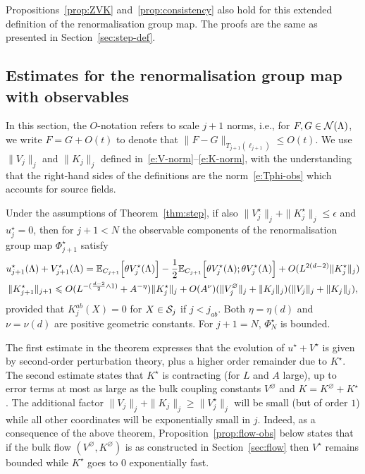 \documentclass[11pt]{amsart}
\numberwithin{equation}{section}
\numberwithin{theorem}{section}
\newcommand{\1}{{\bf 1}}
\newcommand{\obs}{\star}
\newcommand{\Vbulk}{V^\varnothing}
\newcommand{\Vobs}{V^\obs}
\newcommand{\uobs}{u^\obs}
\newcommand{\Kbulk}{K^\varnothing}
\newcommand{\Kobs}{K^\obs}
\newcommand{\dplus}{(\frac{d-2}{2} \wedge 1)}
\begin{document}
Propositions~\ref{prop:ZVK}
and~\ref{prop:consistency} also hold for
this extended definition of the renormalisation group map. The proofs
are the same as presented in Section~\ref{sec:step-def}.


\subsection{Estimates for the renormalisation group map with observables}
\label{sec:tyler-renorm-group}

In this section, the $O$-notation refers to scale $j+1$ norms, i.e.,
for $F,G \in \mathcal N(\Lambda)$, we write $F=G+O(t)$ to denote that
$\|F-G\|_{T_{j+1}(\ell_{j+1})} \leq O(t)$. We use
  $\|V_{j}\|_{j}$ and $\|K_{j}\|_{j}$ defined in~\eqref{e:V-norm}--\eqref{e:K-norm},
  with the understanding that the right-hand sides of the definitions
  are the norm~\eqref{e:Tphi-obs} which accounts for source fields.

\begin{theorem} 
  \label{thm:step-obs} 
  Under the assumptions of Theorem~\ref{thm:step}, if also
  $\|\Vobs_j\|_j+\|\Kobs_j\|_j \leq \epsilon$ and $\uobs_j=0$, then for
  $j+1<N$ the observable components of the renormalisation group map
  $\Phi^\obs_{j+1}$ satisfy
  \begin{gather}
    \label{e:V+obs-bd}
    \uobs_{j+1}(\Lambda) +\Vobs_{j+1}(\Lambda)
    =  \E_{C_{j+1}}\qB{\theta \Vobs_j(\Lambda)} - \frac12 \E_{C_{j+1}}\qB{\theta \Vobs_j(\Lambda);\theta\Vobs_j(\Lambda)}
      + O(L^{2(d-2)}\|\Kobs_j\|_j) 
                      \\
    \label{e:K+obs-bd}
    \|\Kobs_{j+1}\|_{j+1} \leq O(L^{-\dplus}+A^{-\eta})\|\Kobs_j\|_j
    + O(A^{\nu}) (\|\Vbulk_j\|_j +\|K_{j}\|_{j})      (\|V_j\|_j+\|K_j\|_j),
  \end{gather}
  provided that $K^{ab}_j(X)=0$ for $X\in \mathcal S_j$ if
  $j<j_{ab}$. Both $\eta=\eta(d)$ and $\nu=\nu(d)$ are
  positive geometric constants.
  For $j+1=N$, $\Phi^\obs_{N}$ is bounded.
\end{theorem}

The first estimate in the theorem expresses that the evolution
of $\uobs+\Vobs$ is given by second-order perturbation theory, plus
a higher order remainder due to $\Kobs$. The second estimate states
that $\Kobs$ is contracting (for $L$ and $A$ large), up to error
terms at most as large as the bulk coupling constants $\Vbulk$ and
$K=\Kbulk+\Kobs$.  The additional factor
$\|V_j\|_j+\|K_j\|_j \geq \|\Vobs_j\|_j$ will be small (but of order
$1$) while all other coordinates will be exponentially small in $j$.
Indeed, as a consequence of the above theorem,
Proposition~\ref{prop:flow-obs} below states that if the bulk flow
$(\Vbulk,\Kbulk)$ is as constructed in Section~\ref{sec:flow} then
$\Vobs$ remains bounded while $\Kobs$ goes to $0$ exponentially fast.
\end{document}
